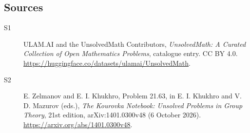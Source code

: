 \documentclass[11pt]{article}
\begin{document}
\subsection{Sources}
\begin{description}
\item[\hypertarget{source:statement:1}{S1}] ULAM.AI and the UnsolvedMath Contributors, \emph{UnsolvedMath: A Curated Collection of Open Mathematics Problems}, catalogue entry. CC BY 4.0. \url{https://huggingface.co/datasets/ulamai/UnsolvedMath}.
\item[\hypertarget{source:statement:2}{S2}] E. Zelmanov and E. I. Khukhro, Problem 21.63, in E. I. Khukhro and V. D. Mazurov (eds.), \emph{The Kourovka Notebook: Unsolved Problems in Group Theory}, 21st edition, arXiv:1401.0300v48 (6 October 2026). \url{https://arxiv.org/abs/1401.0300v48}.
\end{description}
\label{end:statement}
\end{document}
